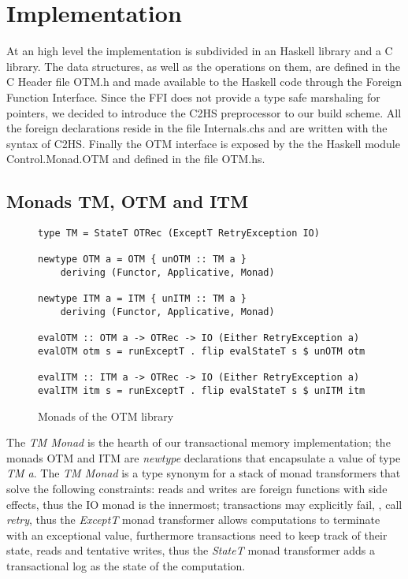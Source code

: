 
\chapter{Implementation}

At an high level the implementation is subdivided in an Haskell library and a C library.
The data structures, as well as the operations on them, are defined in the C Header file OTM.h and made available to the Haskell code through the Foreign Function Interface.
Since the FFI does not provide a type safe marshaling for pointers, we decided to introduce the C2HS preprocessor to our build scheme.
All the foreign declarations reside in the file Internals.chs and are written with the syntax of C2HS.\cite{Chakravarty2000}
Finally the OTM interface is exposed by the the Haskell module Control.Monad.OTM and defined in the file OTM.hs.

\section{Monads TM, OTM and ITM}
\begin{figure}
\begin{Verbatim}
type TM = StateT OTRec (ExceptT RetryException IO)

newtype OTM a = OTM { unOTM :: TM a }
    deriving (Functor, Applicative, Monad)

newtype ITM a = ITM { unITM :: TM a }
    deriving (Functor, Applicative, Monad)

evalOTM :: OTM a -> OTRec -> IO (Either RetryException a)
evalOTM otm s = runExceptT . flip evalStateT s $ unOTM otm

evalITM :: ITM a -> OTRec -> IO (Either RetryException a)
evalITM itm s = runExceptT . flip evalStateT s $ unITM itm
\end{Verbatim}
\caption{Monads of the OTM library}
\label{fig:monads}
\end{figure}
The \emph{TM Monad} is the hearth of our transactional memory implementation;
the monads OTM and ITM are \emph{newtype} declarations that encapsulate a value of type \emph{TM a}.
The \emph{TM Monad} is a type synonym for a stack of monad transformers that solve the following constraints:
reads and writes are foreign functions with side effects, thus the IO monad is the innermost;
transactions may explicitly fail, \ie, call \emph{retry}, thus the \emph{ExceptT} monad transformer allows computations to terminate with an exceptional value,
furthermore transactions need to keep track of their state, reads and tentative writes, thus the \emph{StateT} monad transformer adds a transactional log as the state of the computation.

